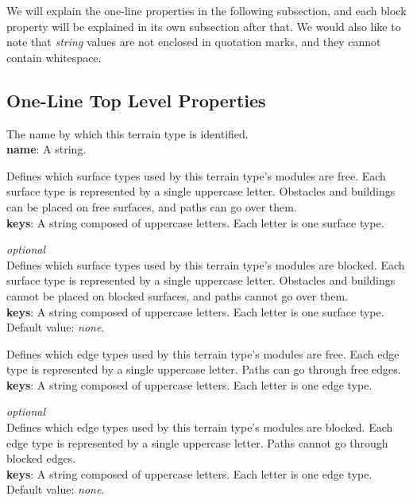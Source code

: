 We will explain the one-line properties in the following subsection, and each block property will be explained in its own subsection after that.
We would also like to note that \emph{string} values are not enclosed in quotation marks, and they cannot contain whitespace.

\subsection{One-Line Top Level Properties}

The name by which this terrain type is identified.\\
\textbf{name}: A string.

Defines which surface types used by this terrain type's modules are free.
Each surface type is represented by a single uppercase letter.
Obstacles and buildings can be placed on free surfaces, and paths can go over them.\\
\textbf{keys}: A string composed of uppercase letters. Each letter is one surface type.

\emph{optional}\\
Defines which surface types used by this terrain type's modules are blocked.
Each surface type is represented by a single uppercase letter.
Obstacles and buildings cannot be placed on blocked surfaces, and paths cannot go over them.\\
\textbf{keys}: A string composed of uppercase letters. Each letter is one surface type.\\
Default value: \emph{none}.

Defines which edge types used by this terrain type's modules are free.
Each edge type is represented by a single uppercase letter.
Paths can go through free edges.\\
\textbf{keys}: A string composed of uppercase letters. Each letter is one edge type.

\emph{optional}\\
Defines which edge types used by this terrain type's modules are blocked.
Each edge type is represented by a single uppercase letter.
Paths cannot go through blocked edges.\\
\textbf{keys}: A string composed of uppercase letters. Each letter is one edge type.\\
Default value: \emph{none}.

